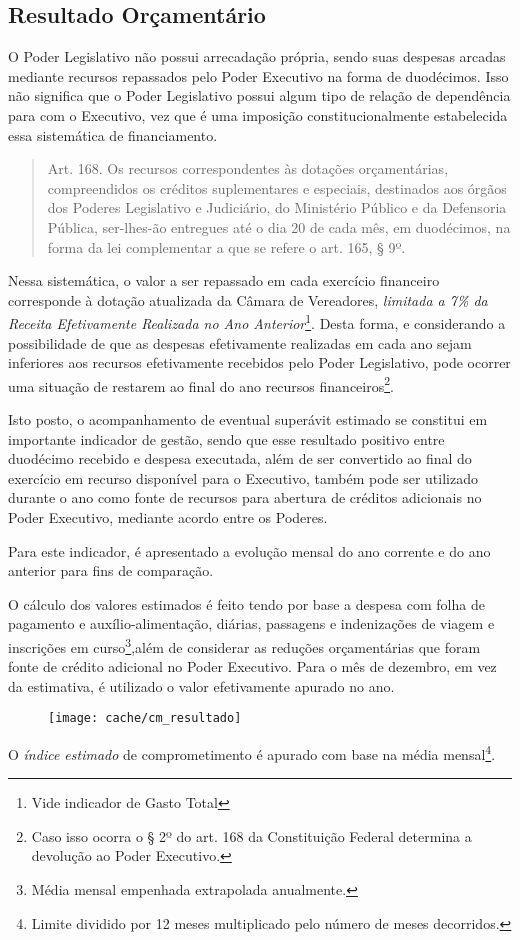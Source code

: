 
\subsection[Resultado Orçamentário]{Resultado Orçamentário}

O Poder Legislativo não possui arrecadação própria, sendo suas despesas arcadas mediante recursos repassados pelo Poder Executivo na forma de duodécimos. Isso não significa que o Poder Legislativo possui algum tipo de relação de dependência para com o Executivo, vez que é uma imposição constitucionalmente estabelecida essa sistemática de financiamento.

\begin{quotation}
Art. 168. Os recursos correspondentes às dotações orçamentárias, compreendidos os créditos suplementares e especiais, destinados aos órgãos dos Poderes Legislativo e Judiciário, do Ministério Público e da Defensoria Pública, ser-lhes-ão entregues até o dia 20 de cada mês, em duodécimos, na forma da lei complementar a que se refere o art. 165, § 9º.
\end{quotation}

Nessa sistemática, o valor a ser repassado em cada exercício financeiro corresponde à dotação atualizada da Câmara de Vereadores, \textit{limitada a 7\% da Receita Efetivamente Realizada no Ano Anterior}\footnote{Vide indicador de Gasto Total}. Desta forma, e considerando a possibilidade de que as despesas efetivamente realizadas em cada ano sejam inferiores aos recursos efetivamente recebidos pelo Poder Legislativo, pode ocorrer uma situação de restarem ao final do ano recursos financeiros\footnote{Caso isso ocorra o § 2º do art. 168 da Constituição Federal determina a devolução ao Poder Executivo.}. 

Isto posto, o acompanhamento de eventual superávit estimado se constitui em importante indicador de gestão, sendo que esse resultado positivo entre duodécimo recebido e despesa executada, além de ser convertido ao final do exercício em recurso disponível para o Executivo, também pode ser utilizado durante o ano como fonte de recursos para abertura de créditos adicionais no Poder Executivo, mediante acordo entre os Poderes.



Para este indicador, é apresentado a evolução mensal do ano corrente e do ano anterior para fins de comparação.

O cálculo dos valores estimados é feito tendo por base a despesa com folha de pagamento e auxílio-alimentação, diárias, passagens e indenizações de viagem e inscrições em curso\footnote{Média mensal empenhada extrapolada anualmente.},além de considerar as reduções orçamentárias que foram fonte de crédito adicional no Poder Executivo.
Para o mês de dezembro, em vez da estimativa, é utilizado o valor efetivamente apurado no ano.

\begin{figure}[H]
\center
\texttt{[image: cache/cm\_resultado]}
\end{figure}

O \textit{índice estimado} de comprometimento é apurado com base na média mensal\footnote{Limite dividido por 12 meses multiplicado pelo número de meses decorridos.}.